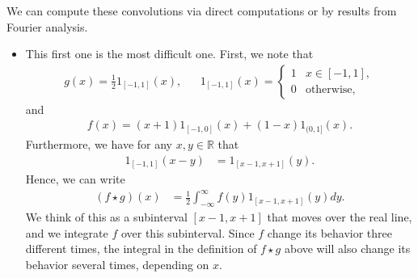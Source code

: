 \documentclass[11pt]{article}
\begin{document}
\begin{solution}
    We can compute these convolutions via direct computations or by results from Fourier analysis.
    \begin{itemize}
        \item 
        This first one is the most difficult one. First, we note that
        \begin{align*}
            g(x) = \frac 1 2 1_{[-1,1]}(x), & & 1_{[-1,1]}(x) = \begin{cases}
                1 & x \in [-1,1],\\
                0 & \text{otherwise},
            \end{cases}
        \end{align*}
        and
        \begin{align*}
            f(x) = (x+1) 1_{[-1,0]}(x) + (1-x) 1_{(0,1]}(x).
        \end{align*}
        Furthermore, we have for any $x, y \in \mathbb R$ that
        \begin{align*}
            1_{[-1, 1]}(x - y) &= 1_{[x - 1, x + 1]}(y).
        \end{align*}
        Hence, we can write
        \begin{align}
            ( f \star g )(x) &= \frac 1 2 \int_{-\infty}^\infty f(y) 1_{[x - 1, x + 1]}(y) dy.
        \end{align}
        We think of this as a subinterval $[x-1,x+1]$ that moves over the real line, 
        and we integrate $f$ over this subinterval. 
        Since $f$ change its behavior three different times, the integral in the definition of $f \star g$ above will also change its behavior several times, depending on $x$.
        

\end{itemize}
\end{solution}
\end{document}
